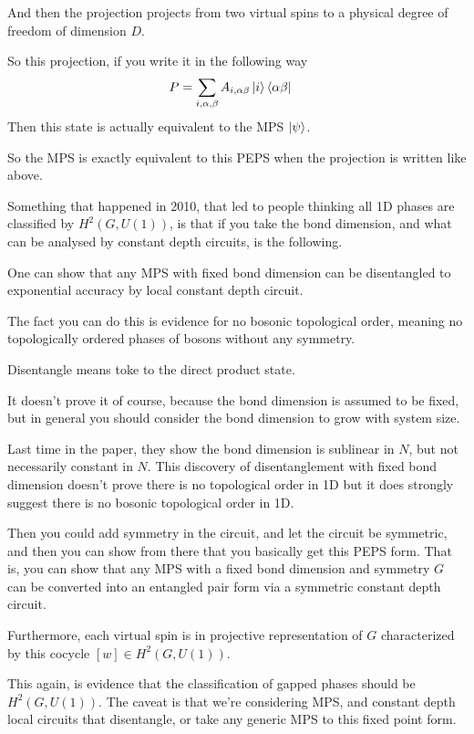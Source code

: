 And then the projection projects from two virtual spins to a physical degree of
freedom of dimension $D$.

So this projection,
if you write it in the following way
\begin{align}
    P &= \sum_{i,\alpha,\beta} A_{i,\alpha\beta} \ket{i}\bra{\alpha\beta}
\end{align}
Then this state is actually equivalent to the MPS $\ket{\psi}$.

So the MPS is exactly equivalent to this PEPS when the projection is written
like above.

Something that happened in 2010,
that led to people thinking all 1D phases are classified by $H^2(G, U(1))$,
is that if you take the bond dimension,
and what can be analysed by constant depth circuits,
is the following.

One can show that any MPS with fixed bond dimension can be disentangled
to exponential accuracy by local constant depth circuit.

The fact you can do this is evidence for no bosonic topological order,
meaning no topologically ordered phases of bosons without any symmetry.

Disentangle means toke to the direct product state.

It doesn't prove it of course,
because the bond dimension is assumed to be fixed,
but in general you should consider the bond dimension to grow with system size.

Last time in the paper,
they show the bond dimension is sublinear in $N$,
but not necessarily constant in $N$.
This discovery of disentanglement with fixed bond dimension doesn't prove there
is no topological order in 1D but it does strongly suggest there is no bosonic
topological order in 1D.

Then you could add symmetry in the circuit,
and let the circuit be symmetric,
and then you can show from there that you basically get this PEPS form.
That is,
you can show that any MPS with a fixed bond dimension and symmetry $G$
can be converted into an entangled pair form via a symmetric constant depth
circuit.

Furthermore, each virtual spin is in projective representation of $G$
characterized by this cocycle
$[w] \in H^2(G,U(1))$.

This again,
is evidence that the classification of gapped phases should be
$H^2(G,U(1))$.
The caveat is that we're considering MPS,
and constant depth local circuits that disentangle,
or take any generic MPS to this fixed point form.

